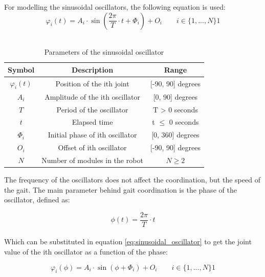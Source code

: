 For modelling the sinusoidal oscillators, the following equation is used:
\begin{equation} \label{eq:sinusoidal_oscillator}
\varphi_i(t) = A_i \cdot \sin{\left( \frac{2\pi}{T} \cdot t + \Phi_i \right)} + O_i \qquad i \in \lbrace 1, ..., N \rbrace 1
\end{equation}\\


\begin{table}[h]
\centering
\begin{tabular}{|c||c|c|} \hline
Symbol & Description & Range \\ \hline \hline
$\varphi_i(t)$ & Position of the ith joint & [-90, 90] degrees \\ \hline
$A_i$ & Amplitude of the ith oscillator & [0, 90] degrees \\ \hline
$T$ & Period of the oscillator &  T > 0 seconds \\ \hline
$t$ & Elapsed time & t $\leq$ 0 seconds \\ \hline
$\Phi_i$ & Initial phase of ith oscillator & [0, 360] degrees \\ \hline
$O_i$ & Offset of ith oscillator & [-90, 90] degrees \\ \hline
$N$ & Number of modules in the robot & $N \geq 2$ \\ \hline
\end{tabular}
\caption{Parameters of the sinusoidal oscillator}
\end{table}

\newpage

The frequency of the oscillators does not affect the coordination, but the speed of the gait. The main parameter behind gait coordination is the phase of the oscillator, defined as:

\begin{equation} \label{eq:phase_of_time}
\phi(t) = \frac{2\pi}{T} \cdot t
\end{equation}\\

Which can be substituted in equation \ref{eq:sinusoidal_oscillator} to get the joint value of the ith oscillator as a function of the phase:

\begin{equation} \label{eq:sinusoidal_oscillator_phase}
\varphi_i(\phi) = A_i \cdot \sin{\left( \phi + \Phi_i \right)} + O_i \qquad i \in \lbrace 1, ..., N \rbrace 1
\end{equation}\\


